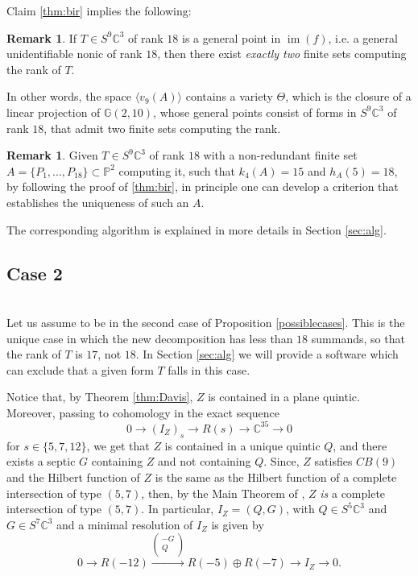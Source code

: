 \documentclass{amsart}
\newcommand{\C}{\mathbb{C}}
\newcommand{\Pj}{\mathbb{P}}
\newcommand{\G}{\mathbb{G}}
\newcommand{\imm}{\operatorname{im}}
\theoremstyle{definition}
\newtheorem{rem0}[thm0]{Remark}
\begin{document}
Claim \ref{thm:bir} implies the following:

\begin{rem0}
If $ T \in S^{9}\C^{3} $ of rank $ 18 $ is a general point in $ \imm(f) $, i.e. a general unidentifiable nonic 
of rank $18$, then there exist \emph{exactly two} finite sets computing the rank of $ T $. 

In other words, the space
$ \langle v_9(A) \rangle $ contains a variety $\Theta$, which is the closure of a linear projection of $ \G(2,10) $, whose general points consist of forms in 
$ S^{9}\C^{3} $ of rank $ 18 $, that admit two finite sets computing the rank. 
\end{rem0}


\begin{rem0}\label{rem:crit} 
Given $ T \in S^{9}\C^{3} $ of rank $ 18 $ with a non-redundant finite set $ A = \{P_{1}, \ldots, P_{18}\} \subset \Pj^{2} $ computing it, 
such that $ k_{4}(A) = 15 $ and $ h_{A}(5) = 18 $, by following the proof of \ref{thm:bir}, in principle one can develop a criterion that establishes the uniqueness 
of such an $ A $. 

The corresponding algorithm is explained in more details in Section \ref{sec:alg}.
\end{rem0}


\subsection{Case 2} \quad\\
\noindent Let us assume to be in the second case of Proposition \ref{possiblecases}. This is the unique case in which the new decomposition has less than
$18$ summands, so that the rank of $T$ is $17$, not $18$. In Section \ref{sec:alg} we will provide a software which can exclude that a given form $T$ falls in this case.
\smallskip

Notice that, by Theorem \ref{thm:Davis}, $ Z$  is contained in a plane quintic. Moreover, passing to cohomology in the exact sequence
$$ 0 \rightarrow (I_{Z})_{s}\rightarrow  R(s) \rightarrow  \C^{35} \rightarrow 0  $$
for $ s \in \{5, 7, 12\} $, we get that $ Z $ is contained in a unique quintic $Q$, and there exists a septic $G$ containing $Z$ and not containing $Q$. Since, $ Z $ satisfies $ CB(9) $ and the Hilbert function of $Z$ is the same as the Hilbert function of a complete intersection of type $ (5,7) $, then, by the Main Theorem of \cite{Davis84}, $ Z $ \emph{is} a complete intersection of type $ (5,7) $. In particular, $ I_{Z} = (Q, G) $, with $ Q \in S^{5} \C^{3} $ and $ G \in S^{7} \C^{3} $ and a minimal resolution of $ I_{Z} $ is given by
$$ 0 \rightarrow R(-12) \xrightarrow {\begin{pmatrix} -G \\ Q \\ \end{pmatrix}} R(-5) \oplus R(-7)  \rightarrow I_{Z} \rightarrow 0. $$ 
\end{document}
